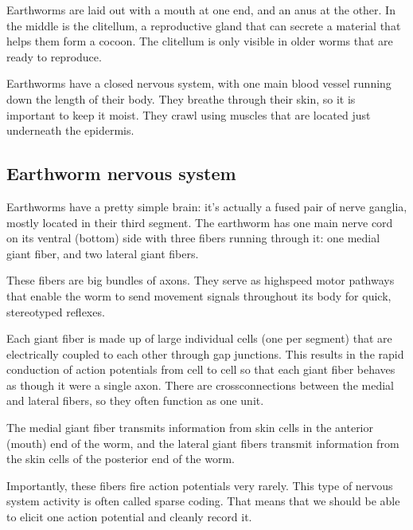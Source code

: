 \documentclass[letterpaper,10pt,english]{jupyterBook}
\begin{document}
\sphinxAtStartPar
Earthworms are laid out with a mouth at one end, and an anus at the other. In the middle is the clitellum, a reproductive gland that can secrete a material that helps them form a cocoon. The clitellum is only visible in older worms that are ready to reproduce.

\sphinxAtStartPar
Earthworms have a closed nervous system, with one main blood vessel running down the length of their body. They breathe through their skin, so it is important to keep it moist. They crawl using muscles that are located just underneath the epidermis.

\sphinxAtStartPar



\subsection{Earthworm nervous system}
\label{\detokenize{Earthworm:earthworm-nervous-system}}
\sphinxAtStartPar
Earthworms have a pretty simple brain: it’s actually a fused pair of nerve ganglia, mostly located in their third segment. The earthworm has one main nerve cord on its ventral (bottom) side with three fibers running through it: one medial giant fiber, and two lateral giant fibers.

\sphinxAtStartPar
These fibers are big bundles of axons. They serve as high\sphinxhyphen{}speed motor pathways that enable the worm to send movement signals throughout its body for quick, stereotyped reflexes.

\sphinxAtStartPar
Each giant fiber is made up of large individual cells (one per segment) that are electrically coupled to each other through gap junctions. This results in the rapid conduction of action potentials from cell to cell so that each giant fiber behaves as though it were a single axon. There are cross\sphinxhyphen{}connections between the medial and lateral fibers, so they often function as one unit.

\sphinxAtStartPar
{} The medial giant fiber transmits information from skin cells in the anterior (mouth) end of the worm, and the lateral giant fibers transmit information from the skin cells of the posterior end of the worm.

\sphinxAtStartPar
{} Importantly, these fibers fire action potentials very rarely. This type of nervous system activity is often called sparse coding. That means that we should be able to elicit one action potential and cleanly record it.
\end{document}
